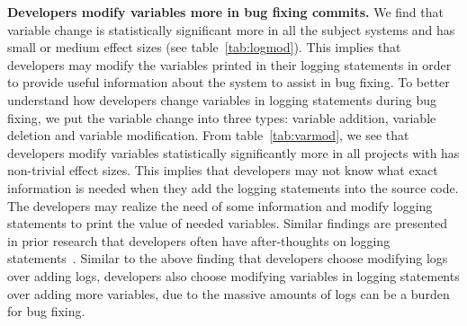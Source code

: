 







\textbf{Developers modify variables more in bug fixing commits.} We find that variable change is statistically significant more in all the subject systems and has small or medium effect sizes (see table~\ref{tab:logmod}). This implies that developers may modify the variables printed in their logging statements in order to provide useful information about the system to assist in bug fixing. To better understand how developers change variables in logging statements during bug fixing, we put the variable change into three types: variable addition, variable deletion and variable modification. From table~\ref{tab:varmod}, we see that developers modify variables statistically significantly more in all projects with has non-trivial effect sizes. This implies that developers may not know what exact information is needed when they add the logging statements into the source code. The developers may realize the need of some information and modify logging statements to print the value of needed variables. Similar findings are presented in prior research that developers often have after-thoughts on logging statements~\cite{Characterizinglogs}. Similar to the above finding that developers choose modifying logs over adding logs, developers also choose modifying variables in logging statements over adding more variables, due to the massive amounts of logs can be a burden for bug fixing.


